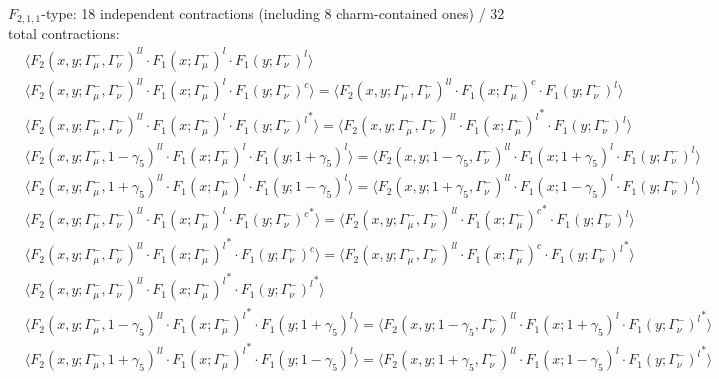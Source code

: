 $F_{2,1,1}$-type: 18 independent contractions (including 8 charm-contained ones) / 32 total contractions:
\begin{align*}
&\Big\langle F_2(x,y;\Gamma_\mu^-,\Gamma_\nu^-)^{ll} \cdot F_1(x;\Gamma_\mu^-)^l \cdot F_1(y;\Gamma_\nu^-)^l\Big\rangle\\
&\Big\langle F_2(x,y;\Gamma_\mu^-,\Gamma_\nu^-)^{ll} \cdot F_1(x;\Gamma_\mu^-)^l \cdot F_1(y;\Gamma_\nu^-)^c\Big\rangle
=\Big\langle F_2(x,y;\Gamma_\mu^-,\Gamma_\nu^-)^{ll} \cdot F_1(x;\Gamma_\mu^-)^c \cdot F_1(y;\Gamma_\nu^-)^l\Big\rangle\\
&\Big\langle F_2(x,y;\Gamma_\mu^-,\Gamma_\nu^-)^{ll} \cdot F_1(x;\Gamma_\mu^-)^l \cdot {F_1(y;\Gamma_\nu^-)^l}^*\Big\rangle
=\Big\langle F_2(x,y;\Gamma_\mu^-,\Gamma_\nu^-)^{ll} \cdot {F_1(x;\Gamma_\mu^-)^l}^* \cdot F_1(y;\Gamma_\nu^-)^l\Big\rangle\\
&\Big\langle F_2(x,y;\Gamma_\mu^-,1-\gamma_5)^{ll} \cdot F_1(x;\Gamma_\mu^-)^l \cdot F_1(y;1+\gamma_5)^l\Big\rangle
=\Big\langle F_2(x,y;1-\gamma_5,\Gamma_\nu^-)^{ll} \cdot F_1(x;1+\gamma_5)^l \cdot F_1(y;\Gamma_\nu^-)^l\Big\rangle\\
&\Big\langle F_2(x,y;\Gamma_\mu^-,1+\gamma_5)^{ll} \cdot F_1(x;\Gamma_\mu^-)^l \cdot F_1(y;1-\gamma_5)^l\Big\rangle
=\Big\langle F_2(x,y;1+\gamma_5,\Gamma_\nu^-)^{ll} \cdot F_1(x;1-\gamma_5)^l \cdot F_1(y;\Gamma_\nu^-)^l\Big\rangle\\
&\Big\langle F_2(x,y;\Gamma_\mu^-,\Gamma_\nu^-)^{ll} \cdot F_1(x;\Gamma_\mu^-)^l \cdot {F_1(y;\Gamma_\nu^-)^c}^*\Big\rangle
=\Big\langle F_2(x,y;\Gamma_\mu^-,\Gamma_\nu^-)^{ll} \cdot {F_1(x;\Gamma_\mu^-)^c}^* \cdot F_1(y;\Gamma_\nu^-)^l\Big\rangle\\
&\Big\langle F_2(x,y;\Gamma_\mu^-,\Gamma_\nu^-)^{ll} \cdot {F_1(x;\Gamma_\mu^-)^l}^* \cdot F_1(y;\Gamma_\nu^-)^c\Big\rangle
=\Big\langle F_2(x,y;\Gamma_\mu^-,\Gamma_\nu^-)^{ll} \cdot F_1(x;\Gamma_\mu^-)^c \cdot {F_1(y;\Gamma_\nu^-)^l}^*\Big\rangle\\
&\Big\langle F_2(x,y;\Gamma_\mu^-,\Gamma_\nu^-)^{ll} \cdot {F_1(x;\Gamma_\mu^-)^l}^* \cdot {F_1(y;\Gamma_\nu^-)^l}^*\Big\rangle\\
&\Big\langle F_2(x,y;\Gamma_\mu^-,1-\gamma_5)^{ll} \cdot {F_1(x;\Gamma_\mu^-)^l}^* \cdot F_1(y;1+\gamma_5)^l\Big\rangle
=\Big\langle F_2(x,y;1-\gamma_5,\Gamma_\nu^-)^{ll} \cdot F_1(x;1+\gamma_5)^l \cdot {F_1(y;\Gamma_\nu^-)^l}^*\Big\rangle\\
&\Big\langle F_2(x,y;\Gamma_\mu^-,1+\gamma_5)^{ll} \cdot {F_1(x;\Gamma_\mu^-)^l}^* \cdot F_1(y;1-\gamma_5)^l\Big\rangle
=\Big\langle F_2(x,y;1+\gamma_5,\Gamma_\nu^-)^{ll} \cdot F_1(x;1-\gamma_5)^l \cdot {F_1(y;\Gamma_\nu^-)^l}^*\Big\rangle\\

\end{align*}
